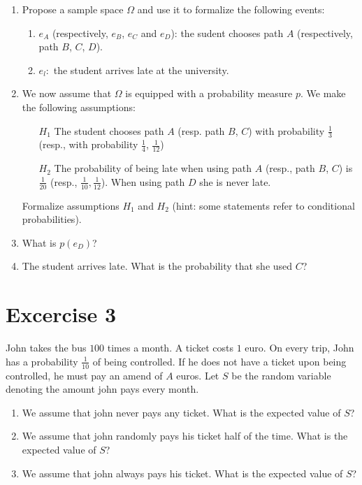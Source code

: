 \documentclass{article}
\begin{document}
\begin{enumerate}
\item Propose a sample space $\Omega$ and use it to formalize the following events:
  \begin{enumerate}
  \item $e_A$ (respectively, $e_B$, $e_C$ and $e_D$): the sudent chooses path $A$ (respectively, path $B$, $C$, $D$).
  \item $e_l:$ the student arrives late at the university.
  \end{enumerate}

\item We now assume that $\Omega$ is equipped with a probability measure $p$. We make the following assumptions:
  \begin{itemize}
  \item[$H_1$] The student chooses path $A$ (resp. path $B$, $C$) with probability $\frac{1}{3}$ (resp., with probability $\frac{1}{4}$, $\frac{1}{12}$)
  \item[$H_2$] The probability of being late when using path $A$ (resp., path $B$, $C$) is $\frac{1}{20}$ (resp., $\frac{1}{10}, \frac{1}{12}$). When using path $D$ she is never late.
  \end{itemize}

  Formalize assumptions $H_1$ and $H_2$ (hint: some statements refer to conditional probabilities).

\item What is $p(e_D)$?
\item The student arrives late. What is the probability that she used $C$?
\end{enumerate}

\section*{Excercise 3}
John takes the bus $100$ times a month. A ticket costs $1$ euro. On every trip, John has a probability $\frac{1}{10}$ of being controlled. If he does not have a ticket upon being controlled, he must pay an amend of $A$ euros. Let $S$ be the random variable denoting the amount john pays every month.
\begin{enumerate}
\item We assume that john never pays any ticket. What is the expected value of $S$?
\item We assume that john randomly pays his ticket half of the time. What is the expected value of $S$?
\item We assume that john always pays his ticket. What is the expected value of $S$?
\end{enumerate}
\end{document}
